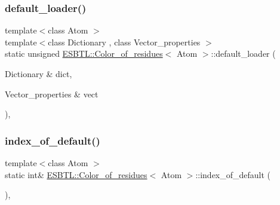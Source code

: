 \subsubsection{\texorpdfstring{default\+\_\+loader()}{default\_loader()}}
{\footnotesize\ttfamily template$<$class Atom $>$ \\
template$<$class Dictionary , class Vector\+\_\+properties $>$ \\
static unsigned \hyperlink{classESBTL_1_1Color__of__residues}{E\+S\+B\+T\+L\+::\+Color\+\_\+of\+\_\+residues}$<$ Atom $>$\+::default\+\_\+loader (\begin{DoxyParamCaption}\item[{Dictionary \&}]{dict,  }\item[{Vector\+\_\+properties \&}]{vect }\end{DoxyParamCaption})\hspace{0.3cm}{\ttfamily [inline]}, {\ttfamily [static]}}

\mbox{\label{classESBTL_1_1Color__of__residues_a558c1d7709ddce95a82cc5d1a6901d7a}} 
\subsubsection{\texorpdfstring{index\+\_\+of\+\_\+default()}{index\_of\_default()}}
{\footnotesize\ttfamily template$<$class Atom $>$ \\
static int\& \hyperlink{classESBTL_1_1Color__of__residues}{E\+S\+B\+T\+L\+::\+Color\+\_\+of\+\_\+residues}$<$ Atom $>$\+::index\+\_\+of\+\_\+default (\begin{DoxyParamCaption}{ }\end{DoxyParamCaption})\hspace{0.3cm}{\ttfamily [inline]}, {\ttfamily [static]}}

\mbox{\label{classESBTL_1_1Color__of__residues_a86da4fab2af81cbe9029e11b7b0376e3}} 
